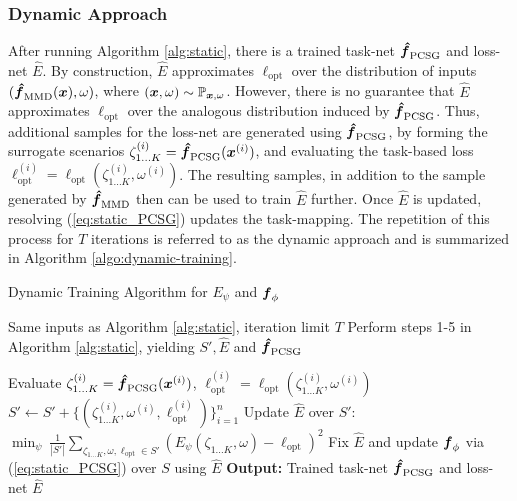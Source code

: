 \subsubsection*{Dynamic Approach}

After running Algorithm \ref{alg:static}, there is a trained task-net $\boldsymbol{\hat{f}}_{\text{PCSG}}$ and loss-net $\hat{E}$. By construction, $\hat{E}$ approximates $\ell_{\text{opt}}$ over the distribution of inputs $(\boldsymbol{\hat{f}}_{\text{MMD}}(\boldsymbol{x}), \omega)$, where $(\boldsymbol{x}, \omega) \sim \mathbb{P}_{\boldsymbol{x}, \omega}$. However, there is no guarantee that $\hat{E}$ approximates $\ell_{\text{opt}}$ over the analogous distribution induced by $\boldsymbol{\hat{f}}_{\text{PCSG}}$. Thus, additional samples for the loss-net are generated using $\boldsymbol{\hat{f}}_{\text{PCSG}}$, by forming the surrogate scenarios $\zeta_{1 \hdots K}^{(i)} = \boldsymbol{\hat{f}}_{\text{PCSG}}(\boldsymbol{x}^{(i)})$, and evaluating the task-based loss $\ell_{\text{opt}}^{(i)} = \ell_{\text{opt}}(\zeta_{1 \hdots K}^{(i)}, \omega^{(i)})$. The resulting samples, in addition to the sample generated by $\boldsymbol{\hat{f}}_{\text{MMD}}$ then can be used to train $\hat{E}$ further. Once $\hat{E}$ is updated, resolving (\ref{eq:static_PCSG}) updates the task-mapping. The repetition of this process for $T$ iterations is referred to as the dynamic approach and is summarized in Algorithm \ref{algo:dynamic-training}.

\begin{algorithm}[h]
  \caption{Dynamic Training Algorithm for $E_{\psi}$ and $\boldsymbol{f}_{\phi}$}
  \label{algo:dynamic-training}
  \small 
  \begin{algorithmic}[1]
    \Require Same inputs as Algorithm \ref{alg:static}, iteration limit $T$
    \State Perform steps 1-5 in Algorithm \ref{alg:static}, yielding $S', \hat{E}$ and $\boldsymbol{\hat{f}}_{\text{PCSG}}$

      \State Evaluate $\zeta_{1 \hdots K}^{(i)} = \boldsymbol{\hat{f}}_{\text{PCSG}}(\boldsymbol{x}^{(i)})$,  $\ell_{\text{opt}}^{(i)} = \ell_{\text{opt}}(\zeta_{1 \hdots K}^{(i)}, \omega^{(i)})$ 
      \State $S' \gets S' + \{(\zeta_{1 \hdots K}^{(i)}, \omega^{(i)}, \ell_{\text{opt}}^{(i)})\}_{i=1}^{n}$ 
      \EndFor 
  \State Update $\hat{E}$ over $S'$: $\min_{\psi} \  \frac{1}{|S'|} \sum_{\zeta_{1 \hdots K}, \omega, \ell_{\text{opt}} \in S'} (E_{\psi}(\zeta_{1 \hdots K}, \omega) - \ell_{\text{opt}} )^2$
    \State Fix $\hat{E}$ and update $\boldsymbol{f}_{\phi}$ via (\ref{eq:static_PCSG}) over $S$ using $\hat{E}$
    \EndFor
    \State \textbf{Output:} Trained task-net $\boldsymbol{\hat{f}}_{\text{PCSG}}$ and loss-net $\hat{E}$ 
  \end{algorithmic}
\end{algorithm}


